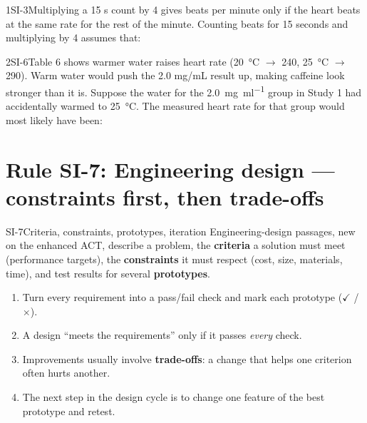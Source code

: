 \documentclass[11pt]{article}
\begin{document}
\begin{q}{1}{SI-3}{Multiplying a 15 s count by 4 gives beats per minute only if the heart beats at the same rate for the rest of the minute.}
Counting beats for 15 seconds and multiplying by 4 assumes that:
\end{q}

\begin{q}{2}{SI-6}{Table 6 shows warmer water raises heart rate (\SI{20}{\celsius} $\to$ 240, \SI{25}{\celsius} $\to$ 290). Warm water would push the 2.0 mg/mL result up, making caffeine look stronger than it is.}
Suppose the water for the \SI{2.0}{\milli\gram\per\milli\litre} group in Study 1 had accidentally warmed to \SI{25}{\celsius}. The measured heart rate for that group would most likely have been:
\end{q}

\section{Rule SI-7: Engineering design --- constraints first, then trade-offs}

\begin{rulebox}{SI-7}{Criteria, constraints, prototypes, iteration}
Engineering-design passages, new on the enhanced ACT, describe a problem, the \textbf{criteria} a solution must meet (performance targets), the \textbf{constraints} it must respect (cost, size, materials, time), and test results for several \textbf{prototypes}.
\begin{enumerate}
\item Turn every requirement into a pass/fail check and mark each prototype ($\checkmark$ / $\times$).
\item A design ``meets the requirements'' only if it passes \emph{every} check.
\item Improvements usually involve \textbf{trade-offs}: a change that helps one criterion often hurts another.
\item The next step in the design cycle is to change one feature of the best prototype and retest.
\end{enumerate}
\end{rulebox}
\end{document}
